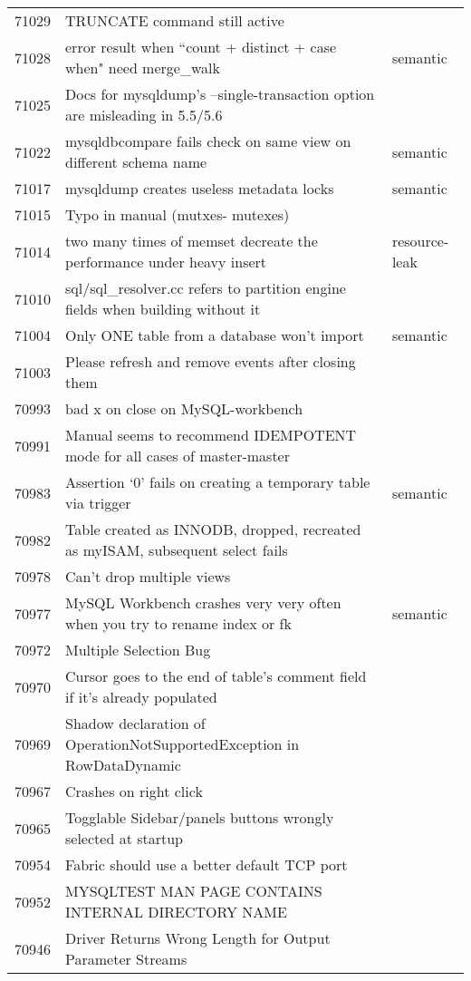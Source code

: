 \begin{longtable}[c]{p{1cm}p{8cm}p{3cm}}
71029 & TRUNCATE command still active &  \\
71028 & error result when ``count + distinct + case when" need merge\_walk & semantic \\
71025 & Docs for mysqldump's --single-transaction option are misleading in 5.5/5.6 &  \\
71022 & mysqldbcompare fails check on same view on different schema name & semantic \\
71017 & mysqldump creates useless metadata locks & semantic \\
71015 & Typo in manual (mutxes- mutexes) &  \\
71014 & two many times of memset decreate the performance under heavy insert & resource-leak \\
71010 & sql/sql\_resolver.cc refers to partition engine fields when building without it &  \\
71004 & Only ONE table from a database won't import & semantic \\
71003 & Please refresh and remove events after closing them &  \\
70993 & bad x on close on MySQL-workbench &  \\
70991 & Manual seems to recommend IDEMPOTENT mode for all cases of master-master &  \\
70983 & Assertion `0' fails on creating a temporary table via trigger & semantic \\
70982 & Table created as INNODB, dropped, recreated as myISAM, subsequent select fails &  \\
70978 & Can't drop multiple views &  \\
70977 & MySQL Workbench crashes very very often when you try to rename index or fk & semantic \\
70972 & Multiple Selection Bug &  \\
70970 & Cursor goes to the end of table's comment field if it's already populated &  \\
70969 & Shadow declaration of OperationNotSupportedException in RowDataDynamic &  \\
70967 & Crashes on right click &  \\
70965 & Togglable Sidebar/panels buttons wrongly selected at startup &  \\
70954 & Fabric should use a better default TCP port &  \\
70952 & MYSQLTEST MAN PAGE CONTAINS INTERNAL DIRECTORY NAME &  \\
70946 & Driver Returns Wrong Length for Output Parameter Streams &  \\

\end{longtable}
